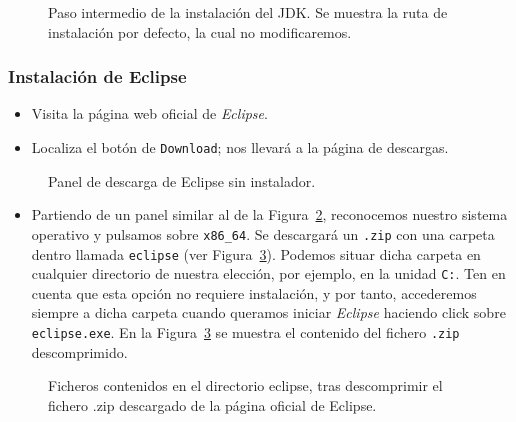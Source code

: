 \documentclass[
  spanish,
  11pt,
  a4paper,
  DIV=11,
  numbers=noendperiod]{scrartcl}
\providecommand{\tightlist}{%
  \setlength{\itemsep}{0pt}\setlength{\parskip}{0pt}}
\begin{document}
\begin{figure}
\caption{Paso intermedio de la instalación del JDK. Se muestra la ruta de instalación por defecto, la cual no modificaremos.}\label{fig-jdk_installation2}
\end{figure}

\subsubsection{Instalación de Eclipse}\label{instalaciuxf3n-de-eclipse}

\begin{itemize}
\tightlist
\item
 Visita la página web oficial de \emph{Eclipse}.
\item
 Localiza el botón de \texttt{Download}; nos llevará a la página de descargas.
\end{itemize}

\begin{figure}
\caption{Panel de descarga de Eclipse sin instalador.}\label{fig-eclipse_download}
\end{figure}

\begin{itemize}
\tightlist
\item
 Partiendo de un panel similar al de la Figura~\ref{fig-eclipse_download}, reconocemos nuestro sistema operativo y pulsamos sobre \texttt{x86\_64}. Se descargará un \texttt{.zip} con una carpeta dentro llamada \texttt{eclipse} (ver Figura~\ref{fig-eclipse_files}). Podemos situar dicha carpeta en cualquier directorio de nuestra elección, por ejemplo, en la unidad \texttt{C:}. Ten en cuenta que esta opción no requiere instalación, y por tanto, accederemos siempre a dicha carpeta cuando queramos iniciar \emph{Eclipse} haciendo click sobre \texttt{eclipse.exe}. En la Figura~\ref{fig-eclipse_files} se muestra el contenido del fichero \texttt{.zip} descomprimido.
\end{itemize}

\begin{figure}
\caption{Ficheros contenidos en el directorio eclipse, tras descomprimir el fichero .zip descargado de la página oficial de Eclipse.}\label{fig-eclipse_files}
\end{figure}
\end{document}
